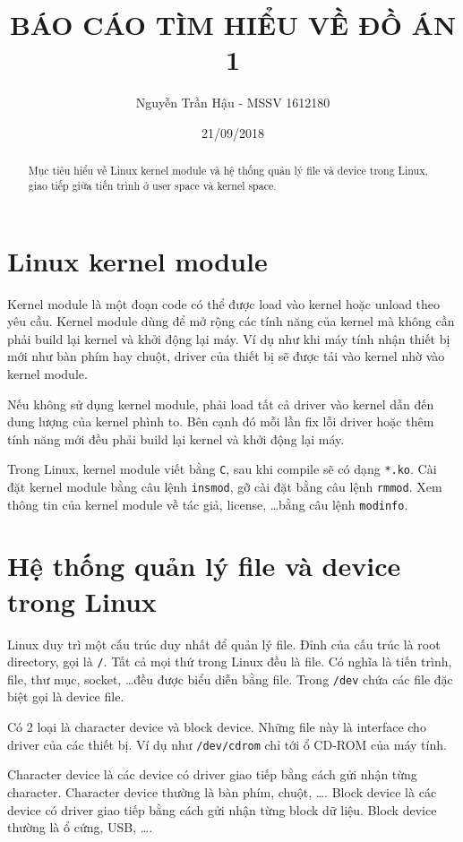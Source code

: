 \documentclass[12pt]{article}
\begin{document}
\title{BÁO CÁO TÌM HIỂU VỀ ĐỒ ÁN 1}
\author{Nguyễn Trần Hậu - MSSV 1612180}
\date{21/09/2018}
\maketitle

\begin{abstract}
Mục tiêu hiểu về Linux kernel module và hệ thống quản lý file và device trong Linux,
giao tiếp giữa tiến trình ở user space và kernel space.
\end{abstract}

\section{Linux kernel module}

Kernel module là một đoạn code có thể được load vào kernel hoặc unload theo yêu cầu.
Kernel module dùng để mở rộng các tính năng của kernel mà không cần phải build lại kernel và khởi động lại máy.
Ví dụ như khi máy tính nhận thiết bị mới như bàn phím hay chuột, driver của thiết bị sẽ được tải vào kernel nhờ vào kernel module.

Nếu không sử dụng kernel module, phải load tất cả driver vào kernel dẫn đến dung lượng của kernel phình to.
Bên cạnh đó mỗi lần fix lỗi driver hoặc thêm tính năng mới đều phải build lại kernel và khởi động lại máy.

Trong Linux, kernel module viết bằng \texttt{C}, sau khi compile sẽ có dạng \texttt{*.ko}.
Cài đặt kernel module bằng câu lệnh \texttt{insmod}, gỡ cài đặt bằng câu lệnh \texttt{rmmod}.
Xem thông tin của kernel module về tác giả, license, \dots bằng câu lệnh \texttt{modinfo}.

\section{Hệ thống quản lý file và device trong Linux}

Linux duy trì một cấu trúc duy nhất để quản lý file.
Đỉnh của cấu trúc là root directory, gọi là \texttt{/}.
Tất cả mọi thứ trong Linux đều là file\cite{file}.
Có nghĩa là tiến trình, file, thư mục, socket, \dots đều được biểu diễn bằng file.
Trong \texttt{/dev} chứa các file đặc biệt gọi là device file.

Có 2 loại là character device và block device.
Những file này là interface cho driver của các thiết bị.
Ví dụ như \texttt{/dev/cdrom} chỉ tới ổ CD-ROM của máy tính.

Character device là các device có driver giao tiếp bằng cách gửi nhận từng character.
Character device thường là bàn phím, chuột, \dots .
Block device là các device có driver giao tiếp bằng cách gửi nhận từng block dữ liệu.
Block device thường là ổ cứng, USB, \dots .
\end{document}
